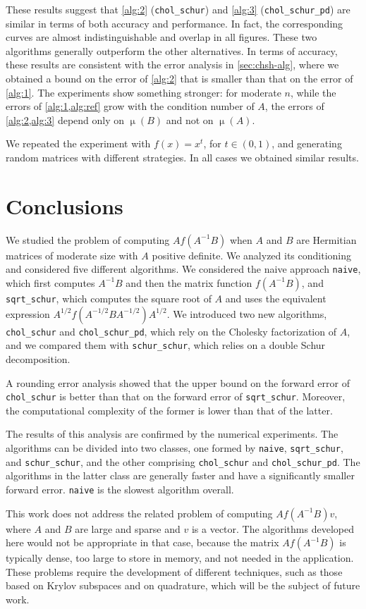 \documentclass[DIV=14]{scrartcl}
\theoremstyle{thmstyletwo}
\theoremstyle{definition}
\numberwithin{equation}{section}
\DeclareMathOperator{\cond}{\mu}
\newcommand{\algnaive}{\texttt{naive}}
\newcommand{\algss}{\texttt{sqrt\_schur}}
\newcommand{\algsc}{\texttt{chol\_schur}}
\newcommand{\algscp}{\texttt{chol\_schur\_pd}}
\newcommand{\algscsc}{\texttt{schur\_schur}}
\begin{document}
{These results suggest that \cref{alg:2} (\algsc{}) and \cref{alg:3} (\algscp{}) are similar in terms of both accuracy and performance. In fact, the corresponding curves are almost indistinguishable and overlap in all figures. These two algorithms generally outperform the other alternatives.
In terms of accuracy, these results are consistent with the error analysis in \cref{sec:chsh-alg}, where we obtained a bound on the error of \cref{alg:2} that is smaller than that on the error of \cref{alg:1}. The experiments show something stronger: for moderate $n$, while the errors of \cref{alg:1,alg:ref} grow with the condition number of $A$, the errors of \cref{alg:2,alg:3} depend only on $\cond(B)$ and not on $\cond(A)$.

We repeated the experiment with $f(x) = x^{t}$, for $t \in (0, 1)$, and generating random matrices with different strategies.
In all cases we obtained similar results.

\section{Conclusions}
\label{sec:conclusions}
We studied the problem of computing $Af(A^{-1}B)$ when $A$ and $B$ are Hermitian matrices of moderate size with $A$ positive definite.
We analyzed its conditioning and considered five different algorithms. We considered the naive approach \algnaive{}, which first computes $A^{-1}B$ and then the matrix function $f(A^{-1}B)$, and \algss{}, which computes the square root of $A$ and uses the equivalent expression $A^{1/2}f(A^{-1/2}BA^{-1/2})A^{1/2}$. We introduced two new algorithms, \algsc{} and \algscp{}, which rely on the Cholesky factorization of $A$, and we compared them with \algscsc{}, which relies on a double Schur decomposition.

A rounding error analysis showed that the upper bound on the forward error of \algsc{} is better than that on the forward error of \algss{}.
Moreover, the computational complexity of the former is lower than that of the latter.

The results of this analysis are confirmed by the numerical experiments. The algorithms can be divided into two classes, one formed by \algnaive{}, \algss{}, and \algscsc{}, and the other comprising \algsc{} and \algscp{}. The algorithms in the latter class are generally faster and have a significantly smaller forward error. \algnaive{} is the slowest algorithm overall.

This work does not address the related problem of computing $Af(A^{-1}B)v$, where $A$ and $B$ are large and sparse and $v$ is a vector. The algorithms developed here would not be appropriate in that case, because the matrix $Af(A^{-1}B)$ is typically dense, too large to store in memory, and not needed in the application. These problems require the development of different techniques, such as those based on Krylov subspaces and on quadrature, which will be the subject of future work.

}
\end{document}

